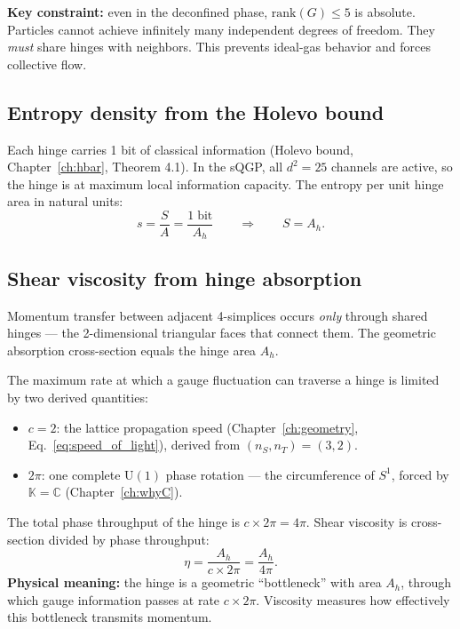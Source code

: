 \textbf{Key constraint:} even in the deconfined phase, $\text{rank}(G) \leq 5$ is absolute. Particles cannot achieve infinitely many independent degrees of freedom. They \emph{must} share hinges with neighbors. This prevents ideal-gas behavior and forces collective flow.

\subsection{Entropy density from the Holevo bound}

Each hinge carries 1 bit of classical information (Holevo bound, Chapter~\ref{ch:hbar}, Theorem 4.1). In the sQGP, all $d^2 = 25$ channels are active, so the hinge is at maximum local information capacity. The entropy per unit hinge area in natural units:
\begin{equation}
s = \frac{S}{A} = \frac{1\;\text{bit}}{A_h} \qquad\Rightarrow\qquad S = A_h.
\end{equation}

\subsection{Shear viscosity from hinge absorption}

Momentum transfer between adjacent 4-simplices occurs \emph{only} through shared hinges --- the 2-dimensional triangular faces that connect them. The geometric absorption cross-section equals the hinge area $A_h$.

The maximum rate at which a gauge fluctuation can traverse a hinge is limited by two derived quantities:
\begin{itemize}
\item $c = 2$: the lattice propagation speed (Chapter~\ref{ch:geometry}, Eq.~\ref{eq:speed_of_light}), derived from $(n_S, n_T) = (3, 2)$.
\item $2\pi$: one complete $\text{U}(1)$ phase rotation --- the circumference of $S^1$, forced by $\mathbb{K} = \mathbb{C}$ (Chapter~\ref{ch:whyC}).
\end{itemize}

The total phase throughput of the hinge is $c \times 2\pi = 4\pi$. Shear viscosity is cross-section divided by phase throughput:
\begin{equation}
\eta = \frac{A_h}{c \times 2\pi} = \frac{A_h}{4\pi}.
\end{equation}
\textbf{Physical meaning:} the hinge is a geometric ``bottleneck'' with area $A_h$, through which gauge information passes at rate $c \times 2\pi$. Viscosity measures how effectively this bottleneck transmits momentum.

